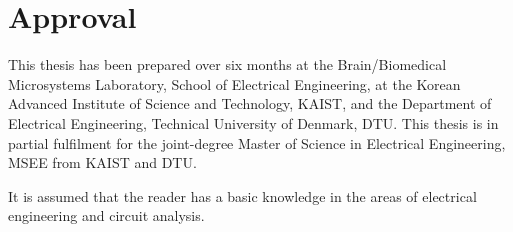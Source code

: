 \thispagestyle{main}
\setcounter{page}{1}
\chapter*{Approval}
This thesis has been prepared over six months at the Brain/Biomedical Microsystems Laboratory, School of Electrical Engineering, at the Korean Advanced Institute of Science and Technology, KAIST, and the Department of Electrical Engineering, Technical University of Denmark, DTU. This thesis is in partial fulfilment for the joint-degree Master of Science in Electrical Engineering, MSEE from KAIST and DTU.

It is assumed that the reader has a basic knowledge in the areas of electrical engineering and circuit analysis. 

\vfill

\begin{center}
\namesigdate{\thesisauthor~-~\studentnumber}
\end{center}

\vfill

